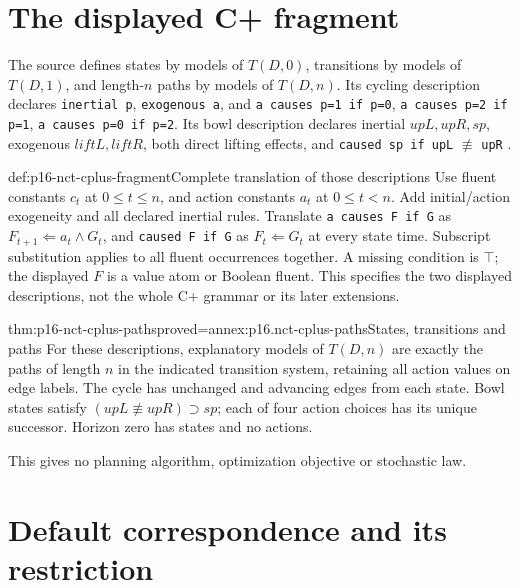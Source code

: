 \section{The displayed C+ fragment}
\label{sec:p16-nct-cplus}

The source defines states by models of \(T(D,0)\), transitions by models
of \(T(D,1)\), and length-\(n\) paths by models of \(T(D,n)\).
Its cycling description declares \texttt{inertial p}, \texttt{exogenous a},
and \texttt{a causes p=1 if p=0}, \texttt{a causes p=2 if p=1},
\texttt{a causes p=0 if p=2}. Its bowl description declares inertial
\(upL,upR,sp\), exogenous \(liftL,liftR\), both direct lifting effects,
and \texttt{caused sp if upL} \(\not\equiv\) \texttt{upR}
\cite[pp.~770--771]{Turner2008NonmonotonicCausalLogic}.

\begin{hbdefinition}{def:p16-nct-cplus-fragment}{Complete translation of those descriptions}
Use fluent constants \(c_t\) at \(0\leq t\leq n\), and action constants
\(a_t\) at \(0\leq t<n\). Add initial/action exogeneity and all declared
inertial rules.
Translate \texttt{a causes F if G} as
\(F_{t+1}\Leftarrow a_t\land G_t\), and \texttt{caused F if G}
as \(F_t\Leftarrow G_t\) at every state time.
Subscript substitution applies to all fluent occurrences together.
A missing condition is \(\top\); the displayed \(F\) is a value atom
or Boolean fluent. This specifies the two displayed descriptions, not
the whole C+ grammar or its later extensions.
\end{hbdefinition}

\begin{hbtheorem}{thm:p16-nct-cplus-paths}{proved=annex:p16.nct-cplus-paths}{States, transitions and paths}
For these descriptions, explanatory models of \(T(D,n)\) are exactly
the paths of length \(n\) in the indicated transition system, retaining
all action values on edge labels.
The cycle has unchanged and advancing edges from each state.
Bowl states satisfy \((upL\not\equiv upR)\supset sp\); each of four action
choices has its unique successor. Horizon zero has states and no actions.
\end{hbtheorem}

This gives no planning algorithm, optimization objective or stochastic law.

\section{Default correspondence and its restriction}
\label{sec:p16-nct-default}

